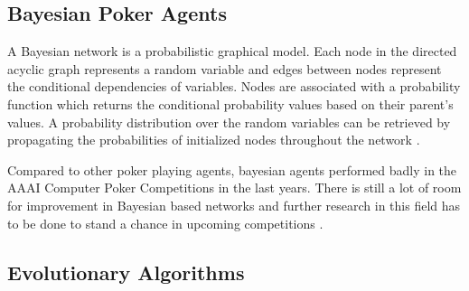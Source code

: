 \subsection{Bayesian Poker Agents}
A Bayesian network is a probabilistic graphical model. Each node in the directed acyclic graph represents a random variable and edges between nodes represent the conditional dependencies of variables. Nodes are associated with a probability function which returns the conditional probability values based on their parent's values. A probability distribution over the random variables can be retrieved by propagating the probabilities of initialized nodes throughout the network \cite{review}. \par
Compared to other poker playing agents, bayesian agents performed badly in the AAAI Computer Poker Competitions in the last years. There is still a lot of room for improvement in Bayesian based networks and further research in this field has to be done to stand a chance in upcoming competitions \cite{review}. 
\subsection{Evolutionary Algorithms}


